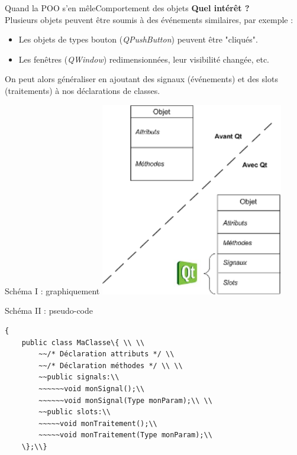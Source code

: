 \documentclass[12pt]{beamer}
\begin{document}
    \begin{frame}{Quand la POO s'en mêle}{Comportement des objets}
        \textbf{Quel intérêt ?}\\
        Plusieurs objets peuvent être soumis à des événements similaires, par exemple :
        \begin{itemize}
            \item{Les objets de types bouton (\textit{QPushButton}) peuvent être "cliqués".}
            \item{Les fenêtres (\textit{QWindow}) redimensionnées, leur visibilité changée, etc.}
        \end{itemize}
    On peut alors généraliser en ajoutant des signaux (événements) et des slots (traitements) à nos déclarations de classes.
    \end{frame}
    \begin{frame}{Schéma I : graphiquement}
    \includegraphics[width=0.6\textwidth]{pictures/sigslot.png}
    \end{frame}
    
    \begin{frame}{Schéma II : pseudo-code}
        \begin{verbatim}{
    public class MaClasse\{ \\ \\
        ~~/* Déclaration attributs */ \\      
        ~~/* Déclaration méthodes */ \\ \\
        ~~public signals:\\
        ~~~~~~void monSignal();\\
        ~~~~~~void monSignal(Type monParam);\\ \\
        ~~public slots:\\
        ~~~~~void monTraitement();\\
        ~~~~~void monTraitement(Type monParam);\\
    \};\\}
    \end{verbatim}
    \\
    \end{frame}
    
\end{document}

